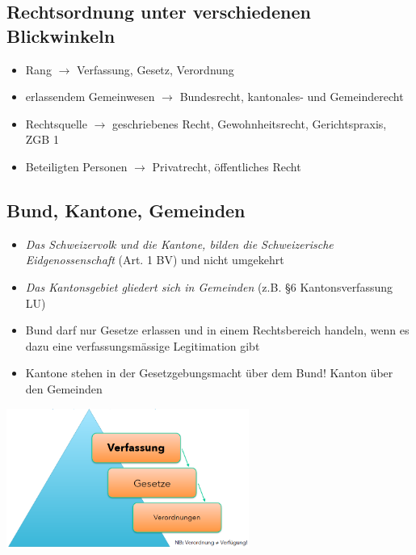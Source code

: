 \documentclass{report}
\newenvironment{Figure}
	{\par\medskip\noindent\minipage{\linewidth}}
	{\endminipage\par\medskip}
\theoremstyle{definition}
\theoremstyle{example}
\begin{document}
\subsection{Rechtsordnung unter verschiedenen Blickwinkeln}
\begin{itemize}
   \item Rang $\rightarrow$ Verfassung, Gesetz, Verordnung
   \item erlassendem Gemeinwesen $\rightarrow$ Bundesrecht, kantonales- und Gemeinderecht
   \item Rechtsquelle $\rightarrow$ geschriebenes Recht, Gewohnheitsrecht, Gerichtspraxis, ZGB 1
   \item Beteiligten Personen $\rightarrow$ Privatrecht, öffentliches Recht
\end{itemize}

\subsection{Bund, Kantone, Gemeinden}
\begin{itemize}
   \item \textit{Das Schweizervolk und die Kantone, bilden die Schweizerische Eidgenossenschaft} (Art. 1 BV) und nicht umgekehrt
   \item \textit{Das Kantonsgebiet gliedert sich in Gemeinden} (z.B. §6 Kantonsverfassung LU)
   \item Bund darf nur Gesetze erlassen und in einem Rechtsbereich handeln, wenn es dazu eine verfassungsmässige Legitimation gibt
   \item Kantone stehen in der Gesetzgebungsmacht über dem Bund! Kanton über den Gemeinden
\end{itemize}

\begin{Figure}
   \centering
    \includegraphics[width=300px]{img/RechtsHierarchie.png}
        \label{fig:Rechtshierarchie }
\end{Figure}
\end{document}
